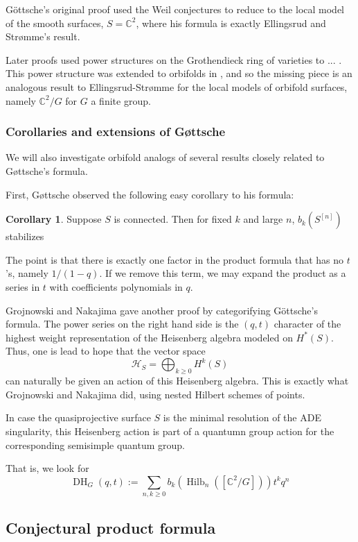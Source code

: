 \documentclass{amsart}[12pt]
\theoremstyle{definition}
\newtheorem{corollary}[dummy]{Corollary}
\newcommand{\C}{\mathbb{C}}
\DeclareMathOperator{\Hilb}{Hilb}
\DeclareMathOperator{\DC}{DH}
\begin{document}
G\"ottsche's original proof used the Weil conjectures to reduce to the local model of the smooth surfaces, $S=\C^2$, where his formula is exactly Ellingsrud and Str\o mme's result.

Later proofs used power structures on the Grothendieck ring of varieties to  ...
.  This power structure was extended to orbifolds in \cite{}, and so the missing piece is an analogous result to Ellingsrud-Str\o mme for the local models of orbifold surfaces, namely $\C^2/G$ for $G$ a finite group.  

\subsubsection{Corollaries and extensions of G\o ttsche}
We will also investigate orbifold analogs of several results closely related to G\o ttsche's formula.

First, G\o ttsche observed the following easy corollary to his formula:
\begin{corollary}  Suppose $S$ is connected.
Then for fixed $k$ and large $n$, $b_{k}(S^{[n]})$ stabilizes
\end{corollary}

The point is that there is exactly one factor in the product formula that has no $t$'s, namely $1/(1-q)$.  If we remove this term, we may expand the product as a series in $t$ with coefficients polynomials in $q$.

Grojnowski and Nakajima gave another proof by categorifying G\"ottsche's formula.  The power series on the right hand side is the $(q,t)$ character of the highest weight representation of the Heisenberg algebra modeled on $H^*(S)$.  Thus, one is lead to hope that the vector space 
$$\mathcal{H}_S=\bigoplus_{k\geq 0} H^k(S)$$
can naturally be given an action of this Heisenberg algebra.  This is exactly what Grojnowski and Nakajima did, using nested Hilbert schemes of points.

In case the quasiprojective surface $S$ is the minimal resolution of the ADE singularity, this Heisenberg action is part of a quantumn group action for the corresponding semisimple quantum group.




That is, we look for 
$$\DC_G(q,t):=\sum_{n,k\geq 0 } b_k(\Hilb_n([\C^2/G])) t^kq^n$$





\subsection{Conjectural product formula}
\end{document}
